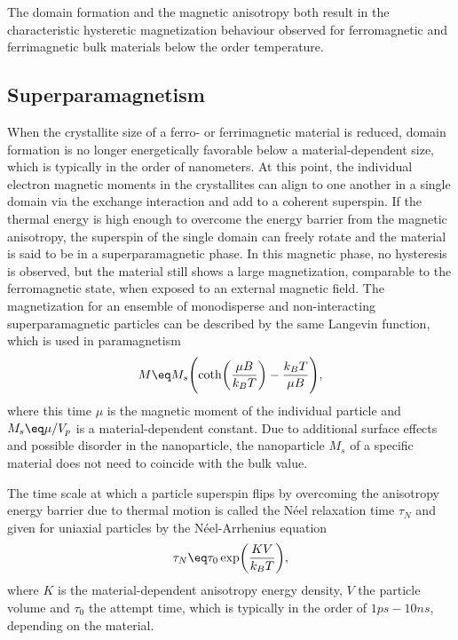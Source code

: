 \documentclass[\main/dresen_thesis.tex]{subfiles}
\begin{document}
      The domain formation and the magnetic anisotropy both result in the characteristic hysteretic magnetization behaviour observed for ferromagnetic and ferrimagnetic bulk materials below the order temperature.

    \subsection{Superparamagnetism}
      When the crystallite size of a ferro- or ferrimagnetic material is reduced, domain formation is no longer energetically favorable below a material-dependent size, which is typically in the order of nanometers.
      At this point, the individual electron magnetic moments in the crystallites can align to one another in a single domain via the exchange interaction and add to a coherent superspin.
      If the thermal energy is high enough to overcome the energy barrier from the magnetic anisotropy, the superspin of the single domain can freely rotate and the material is said to be in a superparamagnetic phase.
      In this magnetic phase, no hysteresis is observed, but the material still shows a large magnetization, comparable to the ferromagnetic state, when exposed to an external magnetic field.
      The magnetization for an ensemble of monodisperse and non-interacting superparamagnetic particles can be described by the same Langevin function, which is used in paramagnetism
      \begin{align}
        M \eq M_s \Biggl( \coth \biggl(\frac{\mu B}{k_B T} \biggr) - \frac{k_B T}{\mu B} \Biggr),
      \end{align}
      where this time $\mu$ is the magnetic moment of the individual particle and $M_s \eq \mu / V_p$ is a material-dependent constant.
      Due to additional surface effects and possible disorder in the nanoparticle, the nanoparticle $M_s$ of a specific material does not need to coincide with the bulk value.

      The time scale at which a particle superspin flips by overcoming the anisotropy energy barrier due to thermal motion is called the Néel relaxation time $\tau_N$ and given for uniaxial particles by the Néel-Arrhenius equation
      \begin{align}
        \tau_N \eq \tau_0 \exp \biggl( \frac{KV}{k_B T} \biggr),
      \end{align}
      where $K$ is the material-dependent anisotropy energy density, $V$ the particle volume and $\tau_0$ the attempt time, which is typically in the order of $1 \unit{ps} - 10 \unit{ns}$, depending on the material.
\end{document}
